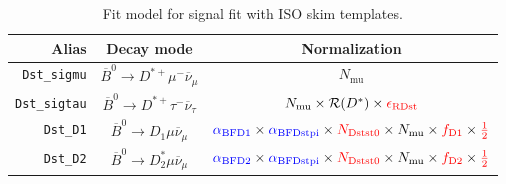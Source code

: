 \begin{landscape}
\begin{table}
\centering
\caption{
    Fit model for \Dstar signal fit with ISO skim templates.
}
\scriptsize


\begin{tabular}{r|c|c}
\toprule
        \textbf{Alias} &                                \textbf{Decay mode}                                &                                                                                                                                                                                   \textbf{Normalization}                                                                                                                                                                                   \\
\midrule
   \texttt{Dst\_sigmu} &           $\overline{B}^0 \rightarrow D^{*+} \mu^- \overline{\nu}_\mu$            &                                                                                                                                                                                       $N_\text{mu}$                                                                                                                                                                                        \\
  \texttt{Dst\_sigtau} &          $\overline{B}^0 \rightarrow D^{*+} \tau^- \overline{\nu}_\tau$           &                                                                                                                                                     $N_\text{mu} \times \mathcal{R}(D^*) \times \textcolor{red}{\epsilon_\text{RDst}}$                                                                                                                                                     \\
      \texttt{Dst\_D1} &              $\overline{B}^0 \rightarrow D_1 \mu \overline{\nu}_\mu$              &                                                                                  $\textcolor{blue}{\alpha_\text{BFD1}} \times \textcolor{blue}{\alpha_\text{BFDstpi}} \times \textcolor{red}{N_\text{Dstst0}} \times N_\text{mu} \times \textcolor{red}{f_\text{D1}} \times \textcolor{red}{\frac{1}{2}}$                                                                                  \\
      \texttt{Dst\_D2} &             $\overline{B}^0 \rightarrow D^*_2 \mu \overline{\nu}_\mu$             &                                                                                  $\textcolor{blue}{\alpha_\text{BFD2}} \times \textcolor{blue}{\alpha_\text{BFDstpi}} \times \textcolor{red}{N_\text{Dstst0}} \times N_\text{mu} \times \textcolor{red}{f_\text{D2}} \times \textcolor{red}{\frac{1}{2}}$                                                                                  \\

\end{tabular}
\end{table}
\end{landscape}
